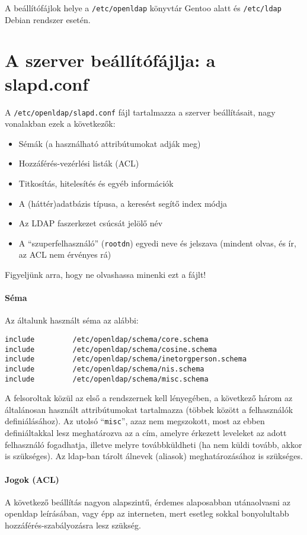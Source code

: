 A beállítófájlok helye a \texttt{/etc/openldap} könyvtár Gentoo alatt és \texttt{/etc/ldap} Debian rendszer esetén.

\section{A szerver beállítófájlja: a slapd.conf}
A \texttt{/etc/openldap/slapd.conf} fájl tartalmazza a szerver beállításait, nagy vonalakban ezek a következők:

\begin{itemize}
\item Sémák (a használható attribútumokat adják meg)
\item Hozzáférés-vezérlési listák (ACL)
\item Titkosítás, hitelesítés és egyéb információk
\item A (háttér)adatbázis típusa, a keresést segítő index módja
\item Az LDAP faszerkezet csúcsát jelölő név
\item A ``szuperfelhasználó'' (\texttt{rootdn}) egyedi neve és jelszava (mindent olvas, és ír, az ACL nem érvényes rá)
\end{itemize}  

Figyeljünk arra, hogy ne olvashassa minenki ezt a fájlt!

\paragraph{Séma} Az általunk használt séma az alábbi:

\begin{Verbatim}[frame=single]
include         /etc/openldap/schema/core.schema
include         /etc/openldap/schema/cosine.schema
include         /etc/openldap/schema/inetorgperson.schema
include         /etc/openldap/schema/nis.schema
include         /etc/openldap/schema/misc.schema
\end{Verbatim}
  
A felsoroltak közül az első a rendszernek kell lényegében, a következő három az általánosan használt attribútumokat tartalmazza
(többek között a felhasználók definiálásához). Az utolsó ``\texttt{misc}'', azaz nem megszokott, most az ebben
definiáltakkal lesz meghatározva az a cím, amelyre érkezett leveleket az adott felhasználó fogadhatja, illetve melyre
továbbküldheti (ha nem küldi tovább, akkor is szükséges). Az ldap-ban tárolt álnevek (aliasok) meghatározásához is
szükséges.

\paragraph{Jogok (ACL)} A következő beállítás nagyon alapszintű, érdemes alaposabban utánaolvasni az openldap
leírásában, vagy épp az interneten, mert esetleg sokkal bonyolultabb hozzáférés-szabályozásra lesz szükség.

